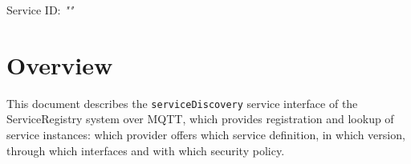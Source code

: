\documentclass[a4paper]{arrowhead}
\begin{document}
\sloppy

\ArrowheadSetup

\begin{center}
  \vspace*{1cm}
  \huge{\arrowtitle}

  \vspace*{0.2cm}
  \LARGE{\arrowtype}
  \vspace*{1cm}

  \Large{Service ID: \textit{"\arrowid"}}

  \vspace*{\fill}


  \vspace*{1cm}
  \vspace*{\fill}

  \begin{abstract}
    This document describes the MQTT protocol with TLS payload security and JSON payload encoding variant of the \texttt{serviceDiscovery} service of the ServiceRegistry system.
  \end{abstract}

  \vspace*{1cm}
\end{center}

\newpage

\tableofcontents
\newpage

\section{Overview}
\label{sec:overview}

This document describes the \texttt{serviceDiscovery} service interface of the ServiceRegistry system over MQTT, which provides registration and lookup of service instances: which provider offers which service definition, in which version, through which interfaces and with which security policy.
\end{document}
